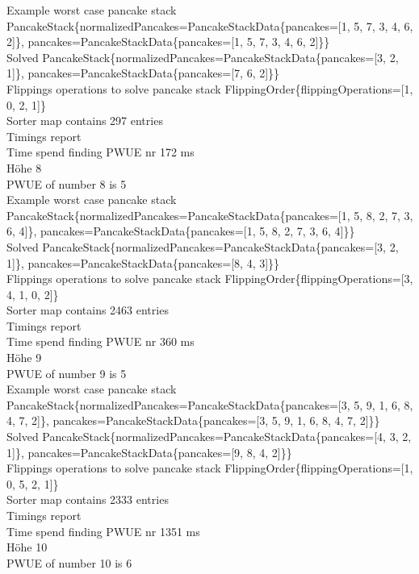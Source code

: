 Example worst case pancake stack PancakeStack\{normalizedPancakes=PancakeStackData\{pancakes=[1, 5, 7, 3, 4, 6, 2]\}, pancakes=PancakeStackData\{pancakes=[1, 5, 7, 3, 4, 6, 2]\}\} \\
Solved PancakeStack\{normalizedPancakes=PancakeStackData\{pancakes=[3, 2, 1]\}, pancakes=PancakeStackData\{pancakes=[7, 6, 2]\}\} \\
Flippings operations to solve pancake stack FlippingOrder\{flippingOperations=[1, 0, 2, 1]\} \\
Sorter map contains 297 entries \\
Timings report \\
Time spend finding PWUE nr 172 ms \\
Höhe 8 \\
PWUE of number 8 is 5 \\
Example worst case pancake stack PancakeStack\{normalizedPancakes=PancakeStackData\{pancakes=[1, 5, 8, 2, 7, 3, 6, 4]\}, pancakes=PancakeStackData\{pancakes=[1, 5, 8, 2, 7, 3, 6, 4]\}\} \\
Solved PancakeStack\{normalizedPancakes=PancakeStackData\{pancakes=[3, 2, 1]\}, pancakes=PancakeStackData\{pancakes=[8, 4, 3]\}\} \\
Flippings operations to solve pancake stack FlippingOrder\{flippingOperations=[3, 4, 1, 0, 2]\} \\
Sorter map contains 2463 entries \\
Timings report \\
Time spend finding PWUE nr 360 ms \\
Höhe 9 \\
PWUE of number 9 is 5 \\
Example worst case pancake stack PancakeStack\{normalizedPancakes=PancakeStackData\{pancakes=[3, 5, 9, 1, 6, 8, 4, 7, 2]\}, pancakes=PancakeStackData\{pancakes=[3, 5, 9, 1, 6, 8, 4, 7, 2]\}\} \\
Solved PancakeStack\{normalizedPancakes=PancakeStackData\{pancakes=[4, 3, 2, 1]\}, pancakes=PancakeStackData\{pancakes=[9, 8, 4, 2]\}\} \\
Flippings operations to solve pancake stack FlippingOrder\{flippingOperations=[1, 0, 5, 2, 1]\} \\
Sorter map contains 2333 entries \\
Timings report \\
Time spend finding PWUE nr 1351 ms \\
Höhe 10 \\
PWUE of number 10 is 6 \\
